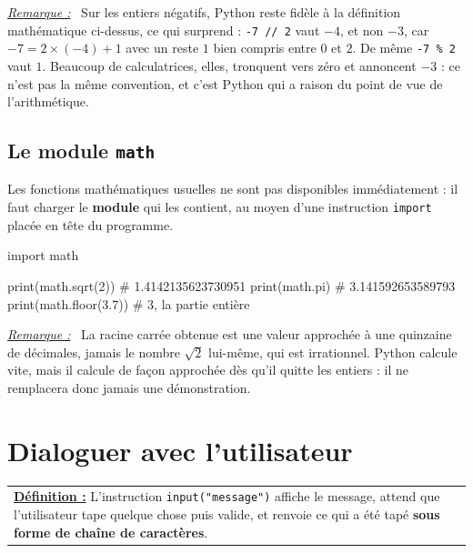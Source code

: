 \documentclass[a4paper,11pt,openany]{book}
\newcommand{\mot}[1]{\textcolor{rougecours}{\textbf{#1}}}
\newcommand{\code}[1]{\texttt{\textcolor{codebleu}{#1}}}
\newenvironment{remarque}%
 {\par\vspace{1mm}\begin{list}{}{\leftmargin=1cm \rightmargin=0.5cm}\item[]%
  \textit{\underline{Remarque :}}~}%
 {\end{list}\vspace{1mm}}
\begin{document}
\begin{remarque}
Sur les entiers négatifs, Python reste fidèle à la définition mathématique ci-dessus, ce qui surprend : \code{-7 // 2} vaut $-4$, et non $-3$, car $-7 = 2 \times (-4) + 1$ avec un reste $1$ bien compris entre $0$ et $2$. De même \code{-7 \% 2} vaut $1$. Beaucoup de calculatrices, elles, tronquent vers zéro et annoncent $-3$ : ce n'est pas la même convention, et c'est Python qui a raison du point de vue de l'arithmétique.
\end{remarque}

\subsection{Le module \texttt{math}}

Les fonctions mathématiques usuelles ne sont pas disponibles immédiatement : il faut charger le \mot{module} qui les contient, au moyen d'une instruction \code{import} placée en tête du programme.

\begin{python}
import math

print(math.sqrt(2))     # 1.4142135623730951
print(math.pi)          # 3.141592653589793
print(math.floor(3.7))  # 3, la partie entière
\end{python}

\begin{remarque}
La racine carrée obtenue est une valeur approchée à une quinzaine de décimales, jamais le nombre $\sqrt{2}$ lui-même, qui est irrationnel. Python calcule vite, mais il calcule de façon approchée dès qu'il quitte les entiers : il ne remplacera donc jamais une démonstration.
\end{remarque}

\section{Dialoguer avec l'utilisateur}

\begin{center}
\begin{tabularx}{15cm}{||X}
\noindent \textbf{\underline{Définition :}} L'instruction \code{input("message")} affiche le message, attend que l'utilisateur tape quelque chose puis valide, et renvoie ce qui a été tapé \mot{sous forme de chaîne de caractères}.
\end{tabularx}
\end{center}
\end{document}
